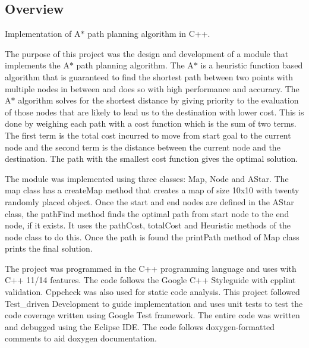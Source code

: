 \href{https://travis-ci.org/inani47/AStar}{\tt } \subsection*{\href{https://coveralls.io/github/inani47/AStar?branch=master}{\tt } }

\subsection*{Overview}

Implementation of A$\ast$ path planning algorithm in C++.

The purpose of this project was the design and development of a module that implements the A$\ast$ path planning algorithm. The A$\ast$ is a heuristic function based algorithm that is guaranteed to find the shortest path between two points with multiple nodes in between and does so with high performance and accuracy. The A$\ast$ algorithm solves for the shortest distance by giving priority to the evaluation of those nodes that are likely to lead us to the destination with lower cost. This is done by weighing each path with a cost function which is the sum of two terms. The first term is the total cost incurred to move from start goal to the current node and the second term is the distance between the current node and the destination. The path with the smallest cost function gives the optimal solution.

The module was implemented using three classes\+: Map, Node and A\+Star. The map class has a create\+Map method that creates a map of size 10x10 with twenty randomly placed object. Once the start and end nodes are defined in the A\+Star class, the path\+Find method finds the optimal path from start node to the end node, if it exists. It uses the path\+Cost, total\+Cost and Heuristic methods of the node class to do this. Once the path is found the print\+Path method of Map class prints the final solution.

The project was programmed in the C++ programming language and uses with C++ 11/14 features. The code follows the Google C++ Styleguide with cpplint validation. Cppcheck was also used for static code analysis. This project followed Test\+\_\+driven Development to guide implementation and uses unit tests to test the code coverage written using Google Test framework. The entire code was written and debugged using the Eclipse I\+DE. The code follows doxygen-\/formatted comments to aid doxygen documentation.

